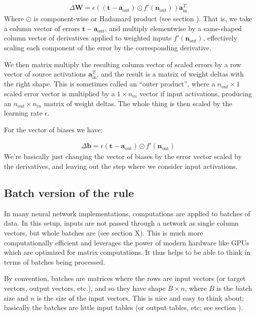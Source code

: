 \begin{eqnarray*}
\Delta \mathbf{W}  =  \epsilon ((\mathbf{t} - \mathbf{a}_{\text{out}}) \odot f'( \mathbf{n}_{\text{out}})) \mathbf{a}_{\text{in}}^T
\end{eqnarray*}
Where $\odot$ is component-wise or Hadamard product (see section ). That is, we take a column vector of errors $\mathbf{t} - \mathbf{a}_{\text{out}}$, and multiply elementwise by a same-shaped column vector of derivatives applied to weighted inputs $f'( \mathbf{n}_{\text{out}})$, effectively scaling each component of the error by the corresponding derivative. 

We then matrix multiply the resulting column vector of scaled errors by a row vector of source activations $ \mathbf{a}_{\text{in}}^T$, and the result is a matrix of weight deltas with the right shape. This is sometimes called an ``outer product'', where a $n_{out} \times 1$ scaled error vector is multiplied by a  $1 \times n_{in}$ vector if input activations, producing an $n_{out} \times n_{in}$ matrix of weight deltas. The whole thing is then scaled by the learning rate $\epsilon$.

For the vector of biases we have:

\begin{eqnarray*}
\Delta \mathbf{b}  =  \epsilon (\mathbf{t} - \mathbf{a}_{\text{out}}) \odot f'( \mathbf{n}_{\text{out}})
\end{eqnarray*}
We're basically just changing the vector of biases by the error vector scaled by the derivatives, and leaving out the step where we consider input activations.

\subsection{Batch version of the rule}

In many neural network implementations, computations are applied to batches of data. In this setup, inputs are not passed through a network as single column vectors, but whole batches are (see section X). This is much more computationally efficient and leverages the power of modern hardware like GPUs which are optimized for matrix computations.  It thus helps to be able to think in terms of batches being processed.

By convention, batches are matrices where the rows are input vectors (or target vectors, output vectors, etc.), and so they have shape $B \times n$, where $B$ is the batch size and $n$ is the size of the input vectors. This is nice and easy to think about; basically the batches are little input tables (or output tables, etc; see section ).

